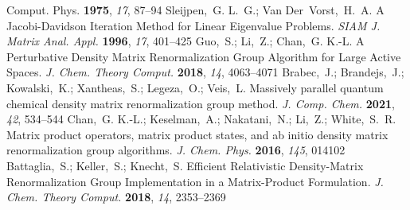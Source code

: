 \documentclass[journal=jctcce]{achemso}
\begin{document}
\begin{mcitethebibliography}{79}
{  Comput. Phys.} \textbf{1975}, \emph{17}, 87--94\relax
\mciteBstWouldAddEndPuncttrue
\mciteSetBstMidEndSepPunct{\mcitedefaultmidpunct}
{\mcitedefaultendpunct}{\mcitedefaultseppunct}\relax
\EndOfBibitem
{}
Sleijpen,~G. L.~G.; Van Der~Vorst,~H.~A. {A Jacobi-Davidson Iteration Method
  for Linear Eigenvalue Problems}. \emph{SIAM J. Matrix Anal. Appl.}
  \textbf{1996}, \emph{17}, 401--425\relax
\mciteBstWouldAddEndPuncttrue
\mciteSetBstMidEndSepPunct{\mcitedefaultmidpunct}
{\mcitedefaultendpunct}{\mcitedefaultseppunct}\relax
\EndOfBibitem
{}
Guo,~S.; Li,~Z.; Chan,~G. K.-L. {A Perturbative Density Matrix Renormalization
  Group Algorithm for Large Active Spaces}. \emph{J. Chem. Theory Comput.}
  \textbf{2018}, \emph{14}, 4063--4071\relax
\mciteBstWouldAddEndPuncttrue
\mciteSetBstMidEndSepPunct{\mcitedefaultmidpunct}
{\mcitedefaultendpunct}{\mcitedefaultseppunct}\relax
\EndOfBibitem
{}
Brabec,~J.; Brandejs,~J.; Kowalski,~K.; Xantheas,~S.; Legeza,~O.; Veis,~L.
  {Massively parallel quantum chemical density matrix renormalization group
  method}. \emph{J. Comp. Chem.} \textbf{2021}, \emph{42}, 534--544\relax
\mciteBstWouldAddEndPuncttrue
\mciteSetBstMidEndSepPunct{\mcitedefaultmidpunct}
{\mcitedefaultendpunct}{\mcitedefaultseppunct}\relax
\EndOfBibitem
{}
Chan,~G. K.-L.; Keselman,~A.; Nakatani,~N.; Li,~Z.; White,~S.~R. {Matrix
  product operators, matrix product states, and ab initio density matrix
  renormalization group algorithms}. \emph{J. Chem. Phys.} \textbf{2016},
  \emph{145}, 014102\relax
\mciteBstWouldAddEndPuncttrue
\mciteSetBstMidEndSepPunct{\mcitedefaultmidpunct}
{\mcitedefaultendpunct}{\mcitedefaultseppunct}\relax
\EndOfBibitem
{}
Battaglia,~S.; Keller,~S.; Knecht,~S. {Efficient Relativistic Density-Matrix
  Renormalization Group Implementation in a Matrix-Product Formulation}.
  \emph{J. Chem. Theory Comput.} \textbf{2018}, \emph{14}, 2353--2369\relax
\mciteBstWouldAddEndPuncttrue
\mciteSetBstMidEndSepPunct{\mcitedefaultmidpunct}
{\mcitedefaultendpunct}{\mcitedefaultseppunct}\relax
\EndOfBibitem
{}

\end{mcitethebibliography}
\end{document}
